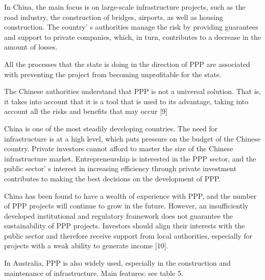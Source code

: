 \begin{multicols}{2}
In China, the main focus is on large-scale infrastructure projects, such
as the road industry, the construction of bridges, airports, as well as
housing construction. The country' s authorities manage
the risk by providing guarantees and support to private companies,
which, in turn, contributes to a decrease in the amount of losses.

All the processes that the state is doing in the direction of PPP are
associated with preventing the project from becoming unprofitable for
the state.

The Chinese authorities understand that PPP is not a universal solution.
That is, it takes into account that it is a tool that is used to its
advantage, taking into account all the risks and benefits that may occur
{[}9{]}

China is one of the most steadily developing countries. The need for
infrastructure is at a high level, which puts pressure on the budget of
the Chinese country. Private investors cannot afford to master the size
of the Chinese infrastructure market. Entrepreneurship is interested in
the PPP sector, and the public sector' s interest in
increasing efficiency through private investment contributes to making
the best decisions on the development of PPP.

China has been found to have a wealth of experience with PPP, and the
number of PPP projects will continue to grow in the future. However, an
insufficiently developed institutional and regulatory framework does not
guarantee the sustainability of PPP projects. Investors should align
their interests with the public sector and therefore receive support
from local authorities, especially for projects with a weak ability to
generate income {[}10{]}.

In Australia, PPP is also widely used, especially in the construction
and maintenance of infrastructure. Main features: see table 5.
\end{multicols}

